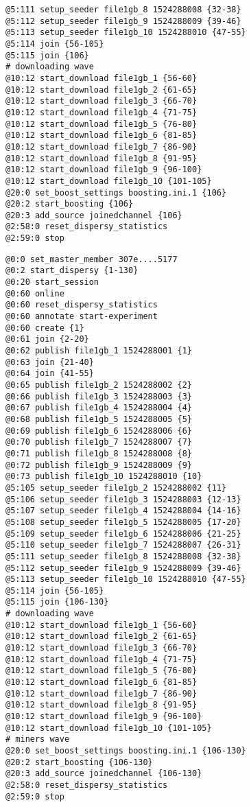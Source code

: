 \begin{appendices}
\begin{lstlisting}[caption={Scenario 1.}]
@5:111 setup_seeder file1gb_8 1524288008 {32-38}
@5:112 setup_seeder file1gb_9 1524288009 {39-46}
@5:113 setup_seeder file1gb_10 1524288010 {47-55}
@5:114 join {56-105}
@5:115 join {106}
# downloading wave
@10:12 start_download file1gb_1 {56-60}
@10:12 start_download file1gb_2 {61-65}
@10:12 start_download file1gb_3 {66-70}
@10:12 start_download file1gb_4 {71-75}
@10:12 start_download file1gb_5 {76-80}
@10:12 start_download file1gb_6 {81-85}
@10:12 start_download file1gb_7 {86-90}
@10:12 start_download file1gb_8 {91-95}
@10:12 start_download file1gb_9 {96-100}
@10:12 start_download file1gb_10 {101-105}
@20:0 set_boost_settings boosting.ini.1 {106}
@20:2 start_boosting {106}
@20:3 add_source joinedchannel {106}
@2:58:0 reset_dispersy_statistics
@2:59:0 stop
\end{lstlisting}

\begin{lstlisting}[caption={Scenario 2.}]
@0:0 set_master_member 307e....5177
@0:2 start_dispersy {1-130}
@0:20 start_session
@0:60 online
@0:60 reset_dispersy_statistics
@0:60 annotate start-experiment
@0:60 create {1}
@0:61 join {2-20}
@0:62 publish file1gb_1 1524288001 {1}
@0:63 join {21-40}
@0:64 join {41-55}
@0:65 publish file1gb_2 1524288002 {2}
@0:66 publish file1gb_3 1524288003 {3}
@0:67 publish file1gb_4 1524288004 {4}
@0:68 publish file1gb_5 1524288005 {5}
@0:69 publish file1gb_6 1524288006 {6}
@0:70 publish file1gb_7 1524288007 {7}
@0:71 publish file1gb_8 1524288008 {8}
@0:72 publish file1gb_9 1524288009 {9}
@0:73 publish file1gb_10 1524288010 {10}
@5:105 setup_seeder file1gb_2 1524288002 {11}
@5:106 setup_seeder file1gb_3 1524288003 {12-13}
@5:107 setup_seeder file1gb_4 1524288004 {14-16}
@5:108 setup_seeder file1gb_5 1524288005 {17-20}
@5:109 setup_seeder file1gb_6 1524288006 {21-25}
@5:110 setup_seeder file1gb_7 1524288007 {26-31}
@5:111 setup_seeder file1gb_8 1524288008 {32-38}
@5:112 setup_seeder file1gb_9 1524288009 {39-46}
@5:113 setup_seeder file1gb_10 1524288010 {47-55}
@5:114 join {56-105}
@5:115 join {106-130}
# downloading wave
@10:12 start_download file1gb_1 {56-60}
@10:12 start_download file1gb_2 {61-65}
@10:12 start_download file1gb_3 {66-70}
@10:12 start_download file1gb_4 {71-75}
@10:12 start_download file1gb_5 {76-80}
@10:12 start_download file1gb_6 {81-85}
@10:12 start_download file1gb_7 {86-90}
@10:12 start_download file1gb_8 {91-95}
@10:12 start_download file1gb_9 {96-100}
@10:12 start_download file1gb_10 {101-105}
# miners wave
@20:0 set_boost_settings boosting.ini.1 {106-130}
@20:2 start_boosting {106-130}
@20:3 add_source joinedchannel {106-130}
@2:58:0 reset_dispersy_statistics
@2:59:0 stop
\end{lstlisting}


\end{appendices}
